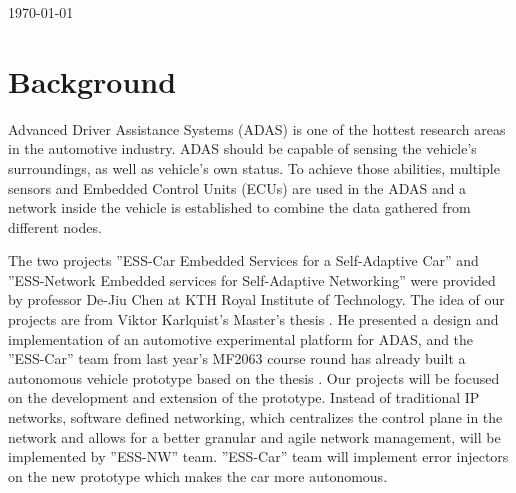 \documentclass[11pt, titlepage]{article} %
\begin{document}
\begin{titlepage}
	
	
	\vfill\vfill\vfill %
	
	{\large\today} %
	
	
	 
	
	\vfill %
	
\end{titlepage}



\section*{Background}
Advanced Driver Assistance Systems (ADAS) is one of the hottest research
areas in the automotive industry. ADAS should be capable of sensing the
vehicle's surroundings, as well as vehicle's own status. To achieve those
abilities, multiple sensors and Embedded Control Units (ECUs) are used
in the ADAS and a network inside the vehicle is established to combine
the data gathered from different nodes.

The two projects ''ESS-Car Embedded Services for a Self-Adaptive Car'' and
''ESS-Network Embedded services for Self-Adaptive Networking'' were
provided by professor De-Jiu Chen at KTH Royal Institute of Technology.
The idea of our projects are from Viktor Karlquist's Master's thesis
\cite{viktor}. He presented a design and implementation of an automotive
experimental platform for ADAS, and the ''ESS-Car'' team from last year's
MF2063 course round has already built a autonomous vehicle prototype based
on the thesis \cite{old_ess}. Our projects will be focused on the
development and extension of the prototype. Instead of traditional IP
networks, software defined networking, which centralizes the control
plane in the network and allows for a better granular and agile network
management, will be implemented by ''ESS-NW'' team. ''ESS-Car'' team will
implement error injectors on the new prototype which makes the car more
autonomous.
\end{document}

